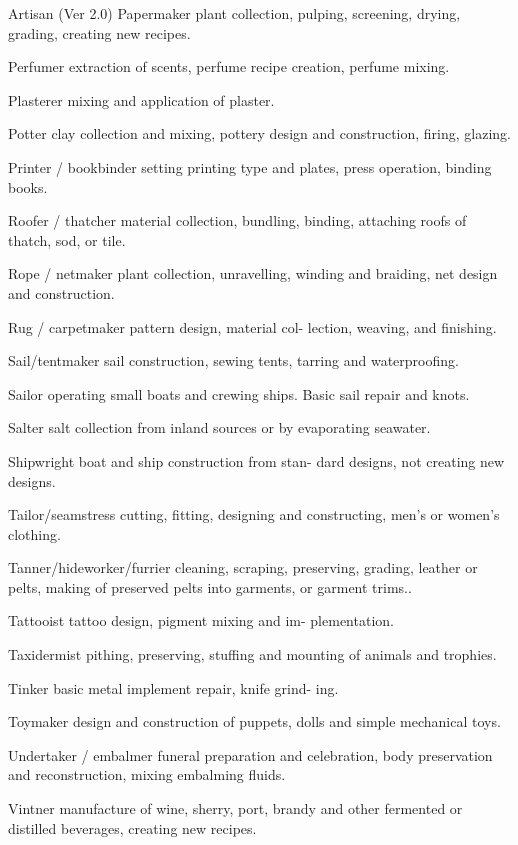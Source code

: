 \begin{Chapter}{Artisan (Ver 2.0)}
Papermaker  plant  collection,  pulping,  screening, 
drying, grading, creating new recipes. 

Perfumer  extraction  of  scents,  perfume  recipe 
creation, perfume mixing. 

Plasterer mixing and application of plaster. 

Potter  clay  collection  and  mixing,  pottery  design 
and construction, firing, glazing. 

Printer  /  bookbinder  setting  printing  type  and 
plates, press operation, binding books. 

Roofer  /  thatcher  material  collection,  bundling, 
binding, attaching roofs of thatch, sod, or tile. 

Rope  /  netmaker  plant  collection,  unravelling, 
winding and braiding, net design and construction. 

Rug  /  carpetmaker  pattern  design,  material  col-
lection, weaving, and finishing. 

Sail/tentmaker  sail  construction,  sewing  tents, 
tarring and waterproofing. 

Sailor  operating  small  boats  and  crewing  ships. 
Basic sail repair and knots. 

Salter  salt  collection  from  inland  sources  or  by 
evaporating seawater. 

Shipwright  boat  and  ship  construction  from  stan-
dard designs, not creating new designs. 

Tailor/seamstress  cutting,  fitting,  designing  and 
constructing, men’s or women’s clothing. 

Tanner/hideworker/furrier  cleaning,  scraping, 
preserving,  grading,  leather  or  pelts,  making  of 
preserved pelts into garments, or garment trims.. 

Tattooist  tattoo  design,  pigment  mixing  and  im-
plementation. 

Taxidermist  pithing,  preserving,  stuffing  and 
mounting of animals and trophies. 

Tinker  basic  metal  implement  repair,  knife  grind-
ing. 

Toymaker  design  and  construction  of  puppets, 
dolls and simple mechanical toys. 

Undertaker  /  embalmer  funeral  preparation  and 
celebration,  body  preservation  and  reconstruction, 
mixing embalming fluids. 

Vintner manufacture of wine, sherry, port, brandy 
and other fermented or distilled beverages, creating 
new recipes. 


\end{Chapter}
